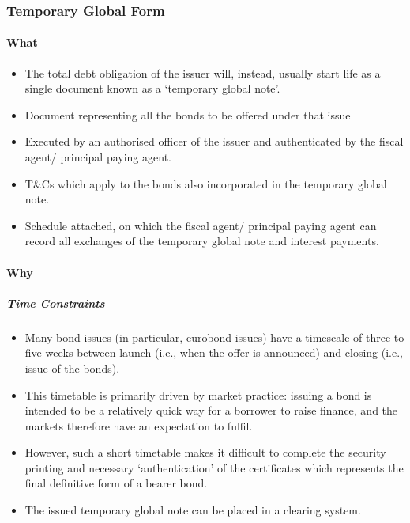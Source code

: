\documentclass[
]{article}
\providecommand{\tightlist}{%
  \setlength{\itemsep}{0pt}\setlength{\parskip}{0pt}}
\begin{document}
\hypertarget{temporary-global-form}{%
\subsubsection{Temporary Global Form}\label{temporary-global-form}}

\hypertarget{what}{%
\paragraph{What}\label{what}}

\begin{itemize}
\tightlist
\item
  The total debt obligation of the issuer will, instead, usually start
  life as a single document known as a `temporary global note'.
\item
  Document representing all the bonds to be offered under that issue
\item
  Executed by an authorised officer of the issuer and authenticated by
  the fiscal agent/ principal paying agent.
\item
  T\&Cs which apply to the bonds also incorporated in the temporary
  global note.
\item
  Schedule attached, on which the fiscal agent/ principal paying agent
  can record all exchanges of the temporary global note and interest
  payments.
\end{itemize}

\hypertarget{why}{%
\paragraph{Why}\label{why}}

\hypertarget{time-constraints}{%
\subparagraph{Time Constraints}\label{time-constraints}}

\begin{itemize}
\tightlist
\item
  Many bond issues (in particular, eurobond issues) have a timescale of
  three to five weeks between launch (i.e., when the offer is announced)
  and closing (i.e., issue of the bonds).
\item
  This timetable is primarily driven by market practice: issuing a bond
  is intended to be a relatively quick way for a borrower to raise
  finance, and the markets therefore have an expectation to fulfil.
\item
  However, such a short timetable makes it difficult to complete the
  security printing and necessary `authentication' of the certificates
  which represents the final definitive form of a bearer bond.
\item
  The issued temporary global note can be placed in a clearing system.
\end{itemize}
\end{document}
